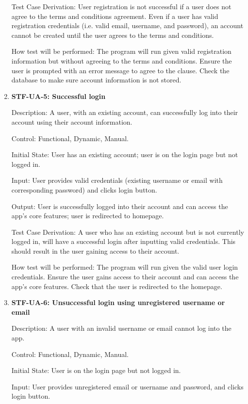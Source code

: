 \documentclass[12pt, titlepage]{article}
\begin{document}
\begin{enumerate}
Test Case Derivation: User registration is not successful if a user does not agree to the terms and conditions agreement. Even if a user has valid registration credentials (i.e. valid email, username, and password), an account cannot be created until the user agrees to the terms and conditions.

How test will be performed: The program will run given valid registration information but without agreeing to the terms and conditions. Ensure the user is prompted with an error message to agree to the clause. Check the database to make sure account information is not stored.

\item{\textbf{STF-UA-5: Successful login}\\}

Description: A user, with an existing account, can successfully log into their account using their account information.
	
Control: Functional, Dynamic, Manual.

Initial State: User has an existing account; user is on the login page but not logged in.

Input: User provides valid credentials (existing username or email with corresponding password) and clicks login button.

Output: User is successfully logged into their account and can access the app’s core features; user is redirected to homepage. 

Test Case Derivation: A user who has an existing account but is not currently logged in, will have a successful login after inputting valid credentials. This should result in the user gaining access to their account.

How test will be performed: The program will run given the valid user login credentials. Ensure the user gains access to their account and can access the app’s core features. Check that the user is redirected to the homepage.

\item{\textbf{STF-UA-6: Unsuccessful login using unregistered username or email}\\}

Description: A user with an invalid username or email cannot log into the app.
	
Control:  Functional, Dynamic, Manual.

Initial State: User is on the login page but not logged in.

Input: User provides unregistered email or username and password, and clicks login button.


\end{enumerate}
\end{document}
